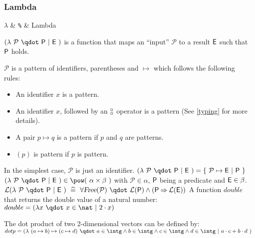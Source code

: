 \begin{samepage}
\subsubsection{Lambda}
\label{lambda}
\newcommand{\lambdapattern}{\mathcal{P}}
\begin{rrnames}
  $\lambda$  & \texttt{\%}  & Lambda
\end{rrnames}
\begin{rodinrefentry}
  \rrdesc
    $(\lambda~\lambdapattern~\qdot~\predp~|~\expre~)$ is a function that maps an ``input'' $\lambdapattern$ to
    a result $\textsf{E}$ such that $\textsf{P}$ holds. 

    $\lambdapattern$ is a pattern of identifiers, parentheses and $\mapsto$ which follows the
    following rules:
    \begin{itemize}
    \item An identifier $x$ is a pattern.
    \item An identifier $x$, followed by an $\boftype$ operator is a pattern (See \ref{typing}
      for more details).
    \item A pair $p\mapsto q$ is a pattern if $p$ and $q$ are patterns.
    \item $(p)$ is pattern if $p$ is pattern.
    \end{itemize}
    In the simplest case, $\lambdapattern$ is just an identifier.
  \rrdef
    $(\lambda~\lambdapattern~\qdot~\predp~|~\expre~) = \{~\lambdapattern\mapsto \expre~|~\predp~\}$
  \rrtypes
    $(\lambda~\lambdapattern~\qdot~\predp~|~\expre~)\in\pow(~\alpha\cprod\beta~)$
    with $\lambdapattern\in\alpha$, $\textsf{P}$ being a predicate and $\textsf{E}\in\beta$.
  \rrwd
    $\wdl(\lambda~\lambdapattern~\qdot~\predp~|~\expre~)~\defi~
    \forall \freeids{\lambdapattern}~\qdot~\wdl(\predp)\land (\predp\limp \wdl(\expre))$
  \rrex
    A function $double$ that returns the double value of a natural number:\\
    $double = (\lambda x~\qdot~x\in\nat~|~2\cdot x)$

    The dot product of two 2-dimensional vectors can be defined by:\\
    $dotp = (\lambda~(a \mapsto b)\mapsto(c \mapsto d)~\qdot~a\in\intg\land  b\in\intg\land  c\in\intg\land  d\in\intg~|~a\cdot c+b\cdot d~)$
\end{rodinrefentry}
\end{samepage}


